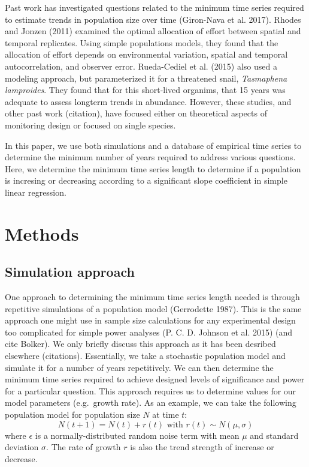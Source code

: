 \documentclass[12pt,]{article}
\begin{document}
Past work has investigated questions related to the minimum time series
required to estimate trends in population size over time (Giron-Nava et
al. 2017). Rhodes and Jonzen (2011) examined the optimal allocation of
effort between spatial and temporal replicates. Using simple populations
models, they found that the allocation of effort depends on
environmental variation, spatial and temporal autocorrelation, and
observer error. Rueda-Cediel et al. (2015) also used a modeling
approach, but parameterized it for a threatened snail,
\emph{Tasmaphena lamproides}. They found that for this short-lived
organims, that 15 years was adequate to assess longterm trends in
abundance. However, these studies, and other past work (citation), have
focused either on theoretical aspects of monitoring design or focused on
single species.

In this paper, we use both simulations and a database of empirical time
series to determine the minimum number of years required to address
various questions. Here, we determine the minimum time series length to
determine if a population is incresing or decreasing according to a
significant slope coefficient in simple linear regression.

\section{Methods}\label{methods}

\subsection{Simulation approach}\label{simulation-approach}

One approach to determining the minimum time series length needed is
through repetitive simulations of a population model (Gerrodette 1987).
This is the same approach one might use in sample size calculations for
any experimental design too complicated for simple power analyses (P. C.
D. Johnson et al. 2015) (and cite Bolker). We only briefly discuss this
approach as it has been desribed elsewhere (citations). Essentially, we
take a stochastic population model and simulate it for a number of years
repetitively. We can then determine the minimum time series required to
achieve designed levels of significance and power for a particular
question. This approach requires us to determine values for our model
parameters (e.g.~growth rate). As an example, we can take the following
population model for population size \(N\) at time \(t\): \[
N(t + 1) = N(t) + r(t) \mbox{ with } r(t) \sim N(\mu, \sigma)
\] where \(\epsilon\) is a normally-distributed random noise term with
mean \(\mu\) and standard deviation \(\sigma\). The rate of growth \(r\)
is also the trend strength of increase or decrease.
\end{document}
